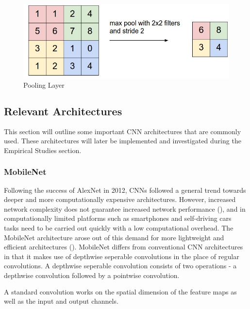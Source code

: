 \documentclass[12pt]{report}
\begin{document}
\vspace{0.5cm}
\begin{figure}[h]
	\centering
	\includegraphics[width=12cm]{pool}
	\caption{Pooling Layer}
	\label{fig:pool}
\end{figure}

\newpage
\subsection{Relevant Architectures}
\begin{flushleft}
This section will outline some important CNN architectures that are commonly used. These architectures will later be implemented and investigated during the Empirical Studies section.
\end{flushleft}

\subsubsection{MobileNet}
\begin{flushleft}
Following the success of AlexNet in 2012, CNNs followed a general trend towards deeper and more computationally expensive architectures. However, increased network complexity does not guarantee increased network performance (\cite{szegedy2016rethinking}), and in computationally limited platforms such as smartphones and self-driving cars tasks need to be carried out quickly with a low computational overhead. The MobileNet architecture arose out of this demand for more lightweight and efficient architectures (\cite{howard2017mobilenets}). MobileNet differs from conventional CNN architectures in that it makes use of depthwise seperable convolutions in the place of regular convolutions. A depthwise seperable convolution consists of two operations - a depthwise convolution followed by a pointwise convolution.

A standard convolution works on the spatial dimension of the feature maps as well as the input and output channels.
\end{flushleft}
\end{document}
